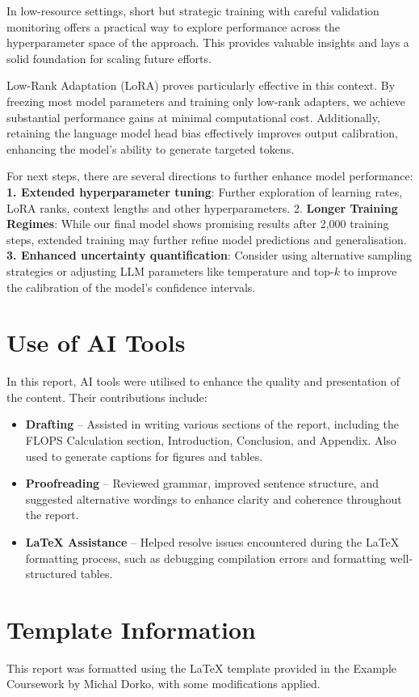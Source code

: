 \documentclass[11pt]{article}
\begin{document}
In low-resource settings, short but strategic training with careful validation monitoring offers a practical way to explore performance across the hyperparameter space of the approach. This provides valuable insights and lays a solid foundation for scaling future efforts.

Low-Rank Adaptation (LoRA) proves particularly effective in this context. By freezing most model parameters and training only low-rank adapters, we achieve substantial performance gains at minimal computational cost. Additionally, retaining the language model head bias effectively improves output calibration, enhancing the model’s ability to generate targeted tokens.

For next steps, there are several directions to further enhance model performance: \textbf{1. Extended hyperparameter tuning}: Further exploration of learning rates, LoRA ranks, context lengths and other hyperparameters. 2. \textbf{Longer Training Regimes}:
While our final model shows promising results after 2,000 training steps, extended training may further refine model predictions and generalisation. 
\textbf{3. Enhanced uncertainty quantification}: Consider using alternative sampling strategies or adjusting LLM parameters like temperature and top-$k$ to improve the calibration of the model’s confidence intervals. 

\clearpage
\newpage
\appendix
\section{Use of AI Tools}
In this report, AI tools were utilised to enhance the quality and presentation of the content. Their contributions include:

\begin{itemize}
    \item \textbf{Drafting} – Assisted in writing various sections of the report, including the FLOPS Calculation section, Introduction, Conclusion, and Appendix. Also used to generate captions for figures and tables.
    
    \item \textbf{Proofreading} – Reviewed grammar, improved sentence structure, and suggested alternative wordings to enhance clarity and coherence throughout the report.
    
    \item \textbf{LaTeX Assistance} – Helped resolve issues encountered during the LaTeX formatting process, such as debugging compilation errors and formatting well-structured tables.
\end{itemize}



\section{Template Information}
This report was formatted using the LaTeX template provided in the Example Coursework by Michal Dorko, with some modifications applied.


\newpage
\printbibliography
\end{document}
